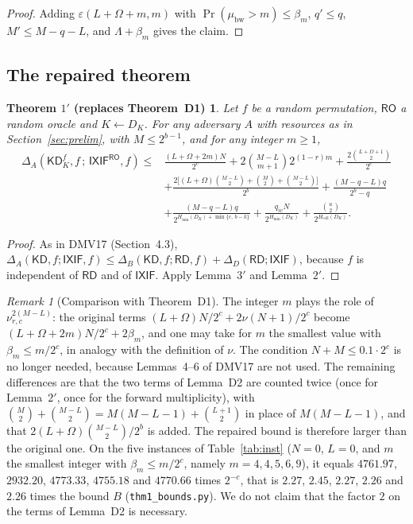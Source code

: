 \documentclass[11pt,a4paper]{article}
\newtheorem*{thmonep}{Theorem $1'$ {\normalfont (replaces Theorem~D1)}}
\theoremstyle{definition}
\theoremstyle{remark}
\newtheorem{remark}{Remark}
\newcommand{\KD}{\mathsf{KD}}
\newcommand{\RD}{\mathsf{RD}}
\newcommand{\IXIF}{\mathsf{IXIF}}
\newcommand{\RO}{\mathsf{RO}}
\newcommand{\mubw}{\mu_{\mathrm{bw}}}
\newcommand{\Hmin}{H_{\min}}
\newcommand{\Hcoll}{H_{\mathrm{coll}}}
\newcommand{\file}[1]{\texttt{#1}}
\begin{document}
\begin{proof}
Adding $\varepsilon(L + \Omega + m, m)$ with $\Pr(\mubw > m) \le \beta_m$, $q' \le q$, $M' \le M - q - L$, and $\Lambda + \beta_m$
gives the claim.
\end{proof}

\subsection{The repaired theorem}
\begin{thmonep}
Let $f$ be a random permutation, $\RO$ a random oracle and $K \leftarrow D_K$. For any adversary $A$ with resources as in
Section~\ref{sec:prelim}, with $M \le 2^{b-1}$, and for any integer $m \ge 1$,
\begin{align*}
\Delta_A(\KD^f_K, f \,;\, \IXIF^{\RO}, f) \le{}& \frac{(L+\Omega+2m)N}{2^c} + 2\binom{M-L}{m+1}2^{(1-r)m}
 + \frac{2\binom{L+\Omega+1}{2}}{2^c} \\
&+ \frac{2\bigl[(L+\Omega)\binom{M-L}{2} + \binom{M}{2} + \binom{M-L}{2}\bigr]}{2^b} + \frac{(M-q-L)q}{2^b-q} \\
&+ \frac{(M-q-L)q}{2^{\Hmin(D_K)+\min\{c,\,b-k\}}} + \frac{q_{iv}N}{2^{\Hmin(D_K)}} + \frac{\binom{u}{2}}{2^{\Hcoll(D_K)}} .
\end{align*}
\end{thmonep}
\begin{proof}
As in DMV17 (Section~4.3), $\Delta_A(\KD, f ; \IXIF, f) \le \Delta_B(\KD, f ; \RD, f) + \Delta_D(\RD ; \IXIF)$, because $f$ is independent of
$\RD$ and of $\IXIF$. Apply Lemma~$3'$ and Lemma~$2'$.
\end{proof}

\begin{remark}[Comparison with Theorem~D1]
The integer $m$ plays the role of $\nu^{2(M-L)}_{r,c}$: the original terms $(L+\Omega)N/2^c + 2\nu(N+1)/2^c$ become
$(L+\Omega+2m)N/2^c + 2\beta_m$, and one may take for $m$ the smallest value with $\beta_m \le m/2^c$, in analogy with
the definition of $\nu$. The condition
$N + M \le 0.1 \cdot 2^c$ is no longer needed, because Lemmas~4--6 of DMV17 are not used. The remaining differences
are that the two terms of Lemma~D2 are counted twice (once for Lemma~$2'$, once for the forward
multiplicity), with $\binom{M}{2} + \binom{M-L}{2} = M(M-L-1) + \binom{L+1}{2}$ in place of $M(M-L-1)$, and that
$2(L+\Omega)\binom{M-L}{2}/2^b$ is added. The repaired bound is therefore larger than the original one. On the five
instances of Table~\ref{tab:inst} ($N = 0$, $L = 0$, and $m$ the smallest integer with $\beta_m \le m/2^c$, namely $m = 4, 4, 5, 6, 9$),
it equals $4761.97$, $2932.20$, $4773.33$, $4755.18$ and $4770.66$ times $2^{-c}$, that is $2.27$, $2.45$, $2.27$, $2.26$ and $2.26$
times the bound $B$ (\file{thm1\_bounds.py}). We do not claim that the factor $2$ on the terms of Lemma~D2 is necessary.
\end{remark}
\end{document}
